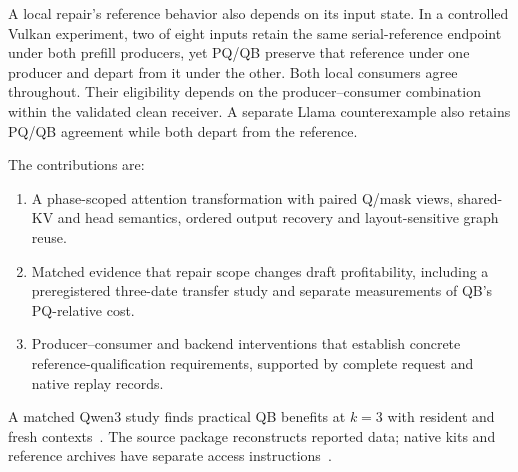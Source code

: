 A local repair's reference behavior also depends on its input state. In a controlled Vulkan experiment, two of eight inputs retain the same serial-reference endpoint under both prefill producers, yet PQ/QB preserve that reference under one producer and depart from it under the other. Both local consumers agree throughout. Their eligibility depends on the producer--consumer combination within the validated clean receiver. A separate Llama counterexample also retains PQ/QB agreement while both depart from the reference.

The contributions are:
\begin{enumerate}[label=(\arabic*),itemsep=2pt]
\item A phase-scoped attention transformation with paired Q/mask views, shared-KV and head semantics, ordered output recovery and layout-sensitive graph reuse.
\item Matched evidence that repair scope changes draft profitability, including a preregistered three-date transfer study and separate measurements of QB's PQ-relative cost.
\item Producer--consumer and backend interventions that establish concrete reference-qualification requirements, supported by complete request and native replay records.
\end{enumerate}
A matched Qwen3 study finds practical QB benefits at $k=3$ with resident and fresh contexts~\cite{rtxnativebridge}. The source package reconstructs reported data; native kits and reference archives have separate access instructions~\cite{studyrecords,rtxnativedelivery,b570nativedelivery}.
